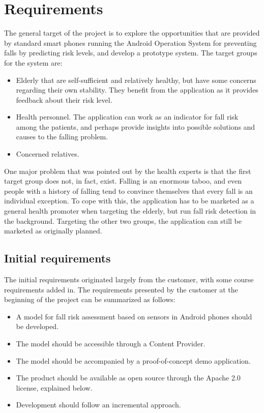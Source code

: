 \chapter{Requirements}

The general target of the project is to explore the opportunities that are provided by standard smart phones running the Android Operation System for preventing falls by predicting risk levels, and develop a prototype system. The target groups for the system are:
\begin{itemize}
\item Elderly that are self-sufficient and relatively healthy, but have some concerns regarding their own stability. They benefit from the application as it provides feedback about their risk level.
\item Health personnel. The application can work as an indicator for fall risk among the patients, and perhaps provide insights into possible 
solutions and causes to the falling problem.
\item Concerned relatives.
\end{itemize}

One major problem that was pointed out by the health experts is that the first target group does not, in fact, exist. Falling is an enormous taboo, and even people with a history of falling tend to convince themselves that every fall is an individual exception. To cope with this, the application has to be marketed as a general health promoter when targeting the elderly, but run fall risk detection in the background. Targeting the other two groups, the application can still be marketed as originally planned. 

\section{Initial requirements}
The initial requirements originated largely from the customer, with some course requirements added in. The requirements presented by the customer at the beginning of the project can be summarized as follows:

\begin{itemize}
\item A model for fall risk assessment based on sensors in Android phones should be developed.
\item The model should be accessible through a Content Provider.
\item The model should be accompanied by a proof-of-concept demo application.
\item The product should be available as open source through the Apache 2.0 license, explained below.
\item Development should follow an incremental approach.
\end{itemize}

